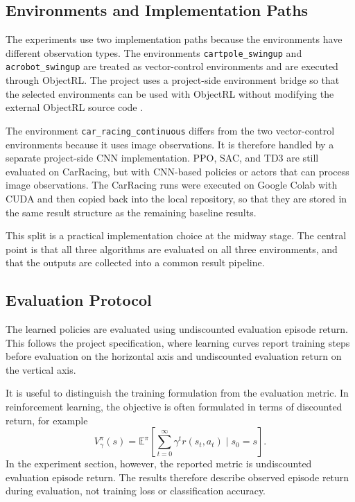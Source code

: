 \subsection{Environments and Implementation Paths}
\label{sec:implementation-paths}

The experiments use two implementation paths because the environments have different observation types. The environments \texttt{cartpole\_swingup} and \texttt{acrobot\_swingup} are treated as vector-control environments and are executed through ObjectRL. The project uses a project-side environment bridge so that the selected environments can be used with ObjectRL without modifying the external ObjectRL source code \citep{baykal2025objectrl}.

The environment \texttt{car\_racing\_continuous} differs from the two vector-control environments because it uses image observations. It is therefore handled by a separate project-side CNN implementation. PPO, SAC, and TD3 are still evaluated on CarRacing, but with CNN-based policies or actors that can process image observations. The CarRacing runs were executed on Google Colab with CUDA and then copied back into the local repository, so that they are stored in the same result structure as the remaining baseline results.

This split is a practical implementation choice at the midway stage. The central point is that all three algorithms are evaluated on all three environments, and that the outputs are collected into a common result pipeline.

\subsection{Evaluation Protocol}
\label{sec:evaluation-protocol}

The learned policies are evaluated using undiscounted evaluation episode return. This follows the project specification, where learning curves report training steps before evaluation on the horizontal axis and undiscounted evaluation return on the vertical axis.

It is useful to distinguish the training formulation from the evaluation metric. In reinforcement learning, the objective is often formulated in terms of discounted return, for example
\[
V^\pi_\gamma(s)
=
\mathbb{E}^{\pi}
\left[
\sum_{t=0}^{\infty} \gamma^t r(s_t,a_t)
\mid s_0=s
\right].
\]
In the experiment section, however, the reported metric is undiscounted evaluation episode return. The results therefore describe observed episode return during evaluation, not training loss or classification accuracy.


